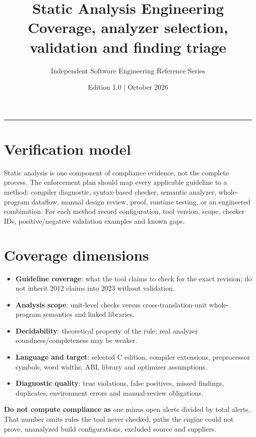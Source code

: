 \documentclass[10pt,letterpaper]{article}
\title{\vspace{-2.3em}\color{DeepNavy}\Huge\bfseries Static Analysis Engineering\\[0.45em]\large\normalfont\color{Teal} Coverage, analyzer selection, validation and finding triage}
\author{Independent Software Engineering Reference Series}
\date{Edition 1.0 \quad | \quad October 2026}
\begin{document}
\maketitle
\vspace{-0.4em}
\begin{center}\color{Slate}\rule{0.83\linewidth}{0.4pt}\end{center}
\DocNotes
\tableofcontents
\newpage

\section{Verification model}
Static analysis is one component of compliance evidence, not the complete process. The enforcement plan should map every applicable guideline to a method: compiler diagnostic, syntax-based checker, semantic analyzer, whole-program dataflow, manual design review, proof, runtime testing, or an engineered combination. For each method record configuration, tool version, scope, checker IDs, positive/negative validation examples and known gaps.
\section{Coverage dimensions}
\begin{itemize}
\item \textbf{Guideline coverage}: what the tool claims to check for the exact revision; do not inherit 2012 claims into 2023 without validation.
\item \textbf{Analysis scope}: unit-level checks versus cross-translation-unit whole-program semantics and linked libraries.
\item \textbf{Decidability}: theoretical property of the rule; real analyzer soundness/completeness may be weaker.
\item \textbf{Language and target}: selected C edition, compiler extensions, preprocessor symbols, word widths, ABI, library and optimizer assumptions.
\item \textbf{Diagnostic quality}: true violations, false positives, missed findings, duplicates, environment errors and manual-review obligations.
\end{itemize}
\begin{keybox}\textbf{Do not compute compliance as} one minus open alerts divided by total alerts. That number omits rules the tool never checked, paths the engine could not prove, unanalyzed build configurations, excluded source and suppliers.\end{keybox}
\end{document}
